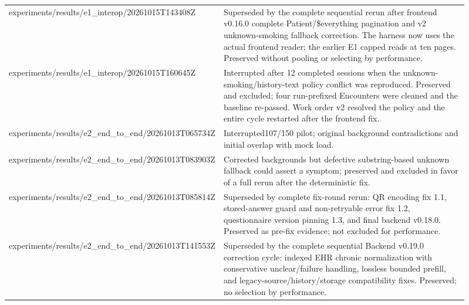 \begin{longtable}{>{\raggedright\arraybackslash}p{0.31\linewidth}>{\raggedright\arraybackslash}p{0.6\linewidth}}
experiments/\allowbreak{}results/\allowbreak{}e1\_\allowbreak{}interop/\allowbreak{}20261015T143408Z & Superseded by the complete sequential rerun after frontend v0.\allowbreak{}16.\allowbreak{}0 complete Patient/\allowbreak{}\$everything pagination and v2 unknown-\allowbreak{}smoking fallback correction.\allowbreak{} The harness now uses the actual frontend reader; the earlier E1 capped reads at ten pages.\allowbreak{} Preserved without pooling or selecting by performance.\allowbreak{} \\
experiments/\allowbreak{}results/\allowbreak{}e1\_\allowbreak{}interop/\allowbreak{}20261015T160645Z & Interrupted after 12 completed sessions when the unknown-\allowbreak{}smoking/\allowbreak{}history-\allowbreak{}text policy conflict was reproduced.\allowbreak{} Preserved and excluded; four run-\allowbreak{}prefixed Encounters were cleaned and the baseline re-\allowbreak{}passed.\allowbreak{} Work order v2 resolved the policy and the entire cycle restarted after the frontend fix.\allowbreak{} \\
experiments/\allowbreak{}results/\allowbreak{}e2\_\allowbreak{}end\_\allowbreak{}to\_\allowbreak{}end/\allowbreak{}20261013T065734Z & Interrupted107/\allowbreak{}150 pilot; original background contradictions and initial overlap with mock load.\allowbreak{} \\
experiments/\allowbreak{}results/\allowbreak{}e2\_\allowbreak{}end\_\allowbreak{}to\_\allowbreak{}end/\allowbreak{}20261013T083903Z & Corrected backgrounds but defective substring-\allowbreak{}based unknown fallback could assert a symptom; preserved and excluded in favor of a full rerun after the deterministic fix.\allowbreak{} \\
experiments/\allowbreak{}results/\allowbreak{}e2\_\allowbreak{}end\_\allowbreak{}to\_\allowbreak{}end/\allowbreak{}20261013T085814Z & Superseded by complete fix-\allowbreak{}round rerun:\allowbreak{} QR encoding fix 1.\allowbreak{}1, stored-\allowbreak{}answer guard and non-\allowbreak{}retryable error fix 1.\allowbreak{}2, questionnaire version pinning 1.\allowbreak{}3, and final backend v0.\allowbreak{}18.\allowbreak{}0.\allowbreak{} Preserved as pre-\allowbreak{}fix evidence; not excluded for performance.\allowbreak{} \\
experiments/\allowbreak{}results/\allowbreak{}e2\_\allowbreak{}end\_\allowbreak{}to\_\allowbreak{}end/\allowbreak{}20261013T141553Z & Superseded by the complete sequential Backend v0.\allowbreak{}19.\allowbreak{}0 correction cycle:\allowbreak{} indexed EHR chronic normalization with conservative unclear/\allowbreak{}failure handling, lossless bounded prefill, and legacy-\allowbreak{}source/\allowbreak{}history/\allowbreak{}storage compatibility fixes.\allowbreak{} Preserved; no selection by performance.\allowbreak{} \\

\end{longtable}
